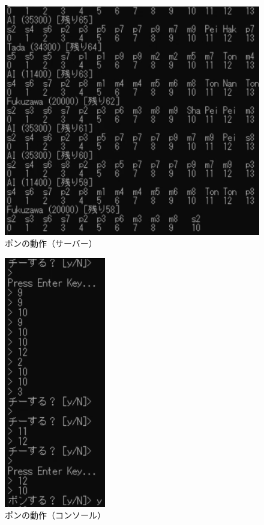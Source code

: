 \documentclass[a4j,titlepage]{jsarticle}
\begin{document}
\begin{figure}[H]
  \centering
  \includegraphics[scale = 0.8]{images/pon_server.png}
  \caption{ポンの動作（サーバー）}
  \label{fig:pon_server}
\end{figure}

\begin{figure}[H]
  \centering
  \includegraphics[scale = 0.8]{images/pon_console.png}
  \caption{ポンの動作（コンソール）}
  \label{fig:pon_console}
\end{figure}
\end{document}
